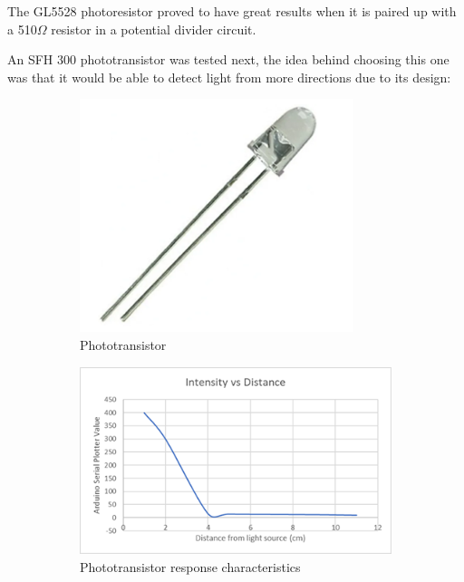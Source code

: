 The GL5528 photoresistor proved to have great results when it is paired up with a 510\(\Omega\) resistor in a potential divider circuit.

An SFH 300 phototransistor was tested next, the idea behind choosing this one was that it would be able to detect light from more directions due to its design:

\begin{figure}
    \centering
    \begin{subfigure}[b]{0.2\linewidth}
        \includegraphics[width=\linewidth]{images/phototransistor.png}
        \caption{Phototransistor}
    \end{subfigure}
    \hspace{2cm}
    \begin{subfigure}[b]{0.4\linewidth}
        \includegraphics[width=\linewidth]{images/phototransistor-graph.png}
        \caption{Phototransistor response characteristics}
    \end{subfigure}
    \caption{}
\end{figure}

